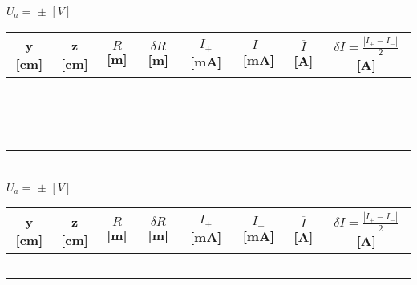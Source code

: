 \documentclass[a4paper,12pt]{article}  %
\begin{document}
\begin{table}[!hbp]
	\centering
	\noindent	$U_a =$ \underline{\makebox[1.5cm][r]{~}} $\pm$ \underline{\makebox[1cm][r]{~}} $[V]$ \\
	\begin{tabular}{|c|c|c|c|c|c|c|c|}
	\hline
	y [cm]  & z [cm]  & $R$ [m] & $\delta R$ [m] & $I_+$ [mA] & $I_-$ [mA] & $\overline{I}$ [A]	& $\delta I = \frac{| I_+ - I_-|}{2}$ [A]  \\
	\hline
	 &  &  &  & &  &  & \\ \cline{5-6}
	 &  &  &  & &  & & \\ \cline{5-6}
	 &  &  &  & &  & & \\ \cline{5-6}
	 \hline
	 &  &  &  & &  & & \\ \cline{5-6}
	 &  &  &  & &  & & \\ \cline{5-6}
	 &  &  &  & &  & & \\ \cline{5-6}
	 \hline
	 &  &  &  & &  & & \\ \cline{5-6}
	 &  &  &  & &  & & \\ \cline{5-6}
	 &  &  &  & &  & & \\ \cline{5-6}
	 \hline
	 &  &  &  & &  & & \\ \cline{5-6}
	 &  &  &  & &  & & \\ \cline{5-6}
	 &  &  &  & &  & & \\ \cline{5-6}
	 \hline
	 &  &  &  & &  & & \\ \cline{5-6}
	 &  &  &  & &  & & \\ \cline{5-6}
	 &  &  &  & &  & & \\ \cline{5-6}
	 \hline
 	\end{tabular}\\
\noindent	$U_a =$ \underline{\makebox[1.5cm][r]{~}} $\pm$ \underline{\makebox[1cm][r]{~}} $[V]$ \\
	\begin{tabular}{|c|c|c|c|c|c|c|c|}
	\hline
	y [cm]  & z [cm]  & $R$ [m] & $\delta R$ [m] & $I_+$ [mA] & $I_-$ [mA] & $\overline{I}$ [A]	& $\delta I = \frac{| I_+ - I_-|}{2}$ [A]  \\
	\hline
	 &  &  &  & &  &  & \\ \cline{5-6}
	 &  &  &  & &  & & \\ \cline{5-6}
	 &  &  &  & &  & & \\ \cline{5-6}
	 \hline
	 &  &  &  & &  & & \\ \cline{5-6}
	 &  &  &  & &  & & \\ \cline{5-6}

\end{tabular}
\end{table}
\end{document}

